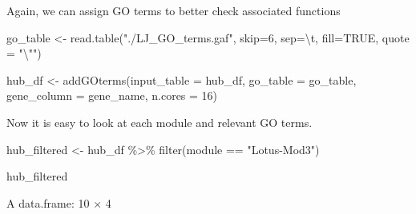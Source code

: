 \documentclass[
  letterpaper,
  DIV=11,
  numbers=noendperiod]{scrartcl}
\newenvironment{Shaded}{\begin{snugshade}}{\end{snugshade}}
\newcommand{\AttributeTok}[1]{\textcolor[rgb]{0.49,0.56,0.16}{#1}}
\newcommand{\ConstantTok}[1]{\textcolor[rgb]{0.53,0.00,0.00}{#1}}
\newcommand{\DecValTok}[1]{\textcolor[rgb]{0.25,0.63,0.44}{#1}}
\newcommand{\FunctionTok}[1]{\textcolor[rgb]{0.02,0.16,0.49}{#1}}
\newcommand{\NormalTok}[1]{\textcolor[rgb]{0.00,0.44,0.13}{#1}}
\newcommand{\OtherTok}[1]{\textcolor[rgb]{0.00,0.44,0.13}{#1}}
\newcommand{\SpecialCharTok}[1]{\textcolor[rgb]{0.25,0.44,0.63}{#1}}
\newcommand{\StringTok}[1]{\textcolor[rgb]{0.25,0.44,0.63}{#1}}
\begin{document}
Again, we can assign GO terms to better check associated functions

\begin{Shaded}
\begin{Highlighting}[]
\NormalTok{go\_table }\OtherTok{\textless{}{-}} \FunctionTok{read.table}\NormalTok{(}\StringTok{"./LJ\_GO\_terms.gaf"}\NormalTok{, }\AttributeTok{skip=}\DecValTok{6}\NormalTok{, }\AttributeTok{sep=}\StringTok{\textquotesingle{}}\SpecialCharTok{\textbackslash{}t}\StringTok{\textquotesingle{}}\NormalTok{, }\AttributeTok{fill=}\ConstantTok{TRUE}\NormalTok{, }\AttributeTok{quote =} \StringTok{"}\SpecialCharTok{\textbackslash{}"}\StringTok{"}\NormalTok{)}
\end{Highlighting}
\end{Shaded}

\begin{Shaded}
\begin{Highlighting}[]
\NormalTok{hub\_df }\OtherTok{\textless{}{-}} \FunctionTok{addGOterms}\NormalTok{(}\AttributeTok{input\_table =}\NormalTok{ hub\_df, }
                     \AttributeTok{go\_table =}\NormalTok{ go\_table, }
                     \AttributeTok{gene\_column =} \StringTok{\textquotesingle{}gene\_name\textquotesingle{}}\NormalTok{,}
                     \AttributeTok{n.cores =} \DecValTok{16}\NormalTok{)}
\end{Highlighting}
\end{Shaded}

Now it is easy to look at each module and relevant GO terms.

\begin{Shaded}
\begin{Highlighting}[]
\NormalTok{hub\_filtered }\OtherTok{\textless{}{-}}\NormalTok{ hub\_df }\SpecialCharTok{\%\textgreater{}\%} \FunctionTok{filter}\NormalTok{(module }\SpecialCharTok{==} \StringTok{"Lotus{-}Mod3"}\NormalTok{)}
\end{Highlighting}
\end{Shaded}

\begin{Shaded}
\begin{Highlighting}[]
\NormalTok{hub\_filtered}
\end{Highlighting}
\end{Shaded}

A data.frame: 10 × 4
\end{document}
